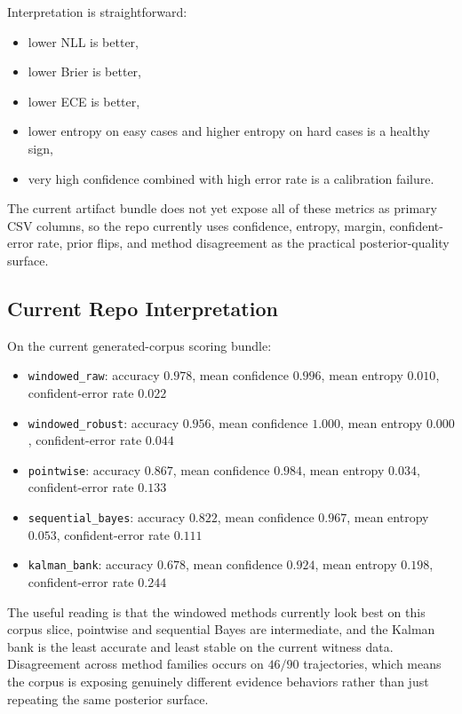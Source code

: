 \documentclass[11pt]{article}
\begin{document}
Interpretation is straightforward:
\begin{itemize}[leftmargin=1.5em]
    \item lower NLL is better,
    \item lower Brier is better,
    \item lower ECE is better,
    \item lower entropy on easy cases and higher entropy on hard cases is a
    healthy sign,
    \item very high confidence combined with high error rate is a calibration
    failure.
\end{itemize}

The current artifact bundle does not yet expose all of these metrics as primary
CSV columns, so the repo currently uses confidence, entropy, margin,
confident-error rate, prior flips, and method disagreement as the practical
posterior-quality surface.

\subsection*{Current Repo Interpretation}

On the current generated-corpus scoring bundle:
\begin{itemize}[leftmargin=1.5em]
    \item \texttt{windowed\_raw}: accuracy \(0.978\), mean confidence \(0.996\),
    mean entropy \(0.010\), confident-error rate \(0.022\)
    \item \texttt{windowed\_robust}: accuracy \(0.956\), mean confidence \(1.000\),
    mean entropy \(0.000\), confident-error rate \(0.044\)
    \item \texttt{pointwise}: accuracy \(0.867\), mean confidence \(0.984\),
    mean entropy \(0.034\), confident-error rate \(0.133\)
    \item \texttt{sequential\_bayes}: accuracy \(0.822\), mean confidence \(0.967\),
    mean entropy \(0.053\), confident-error rate \(0.111\)
    \item \texttt{kalman\_bank}: accuracy \(0.678\), mean confidence \(0.924\),
    mean entropy \(0.198\), confident-error rate \(0.244\)
\end{itemize}
The useful reading is that the windowed methods currently look best on this
corpus slice, pointwise and sequential Bayes are intermediate, and the Kalman
bank is the least accurate and least stable on the current witness data.
Disagreement across method families occurs on \(46/90\) trajectories, which
means the corpus is exposing genuinely different evidence behaviors rather than
just repeating the same posterior surface.
\end{document}
